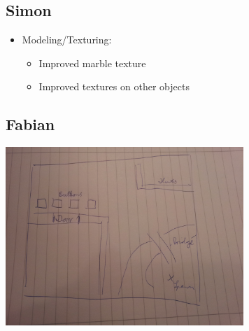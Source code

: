 \documentclass{beamer}
\begin{document}
\subsection{Simon}
\begin{frame}
    \begin{itemize}
    \item Modeling/Texturing:
    \begin{itemize}
        \item Improved marble texture
        \item Improved textures on other objects
    \end{itemize}
    \end{itemize}
\end{frame}

\subsection{Fabian}
\begin{frame}
    \includegraphics[width=9cm]{images/sketch}
\end{frame}
\end{document}
